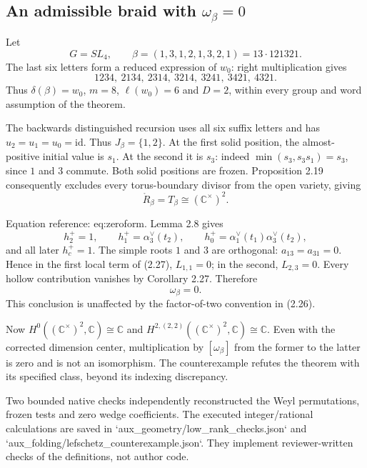 \documentclass[10pt]{article}
\begin{document}
\subsection*{An admissible braid with \(\omega_\beta=0\)}
Let \[G=SL_4,\qquad
 \beta=(1,3,1,2,1,3,2,1)=13\cdot121321 .\] The last six letters form a reduced expression of \(w_0\): right multiplication gives \[1234,\ 2134,\ 2314,\ 3214,\ 3241,\ 3421,\ 4321 .\] Thus \(\delta(\beta)=w_0\), \(m=8\), \(\ell(w_0)=6\) and \(D=2\), within every group and word assumption of the theorem.\par
The backwards distinguished recursion uses all six suffix letters and has \(u_2=u_1=u_0=\mathrm{id}\). Thus \(J_\beta=\{1,2\}\). At the first solid position, the almost-positive initial value is \(s_1\). At the second it is \(s_3\): indeed \(\min(s_3,s_3s_1)=s_3\), since \(1\) and \(3\) commute. Both solid positions are frozen. Proposition 2.19 consequently excludes every torus-boundary divisor from the open variety, giving \[\mathring R_\beta=T_\beta\cong(\mathbb C^\times)^2 .\]\par
Equation reference: eq:zeroform. Lemma 2.8 gives \[h_2^+=1,\qquad
 h_1^+=\alpha_3^\vee(t_2),\qquad
 h_0^+=\alpha_1^\vee(t_1)\alpha_3^\vee(t_2),\] and all later \(h_c^+=1\). The simple roots \(1\) and \(3\) are orthogonal: \(a_{13}=a_{31}=0\). Hence in the first local term of (2.27), \(L_{1,1}=0\); in the second, \(L_{2,3}=0\). Every hollow contribution vanishes by Corollary 2.27. Therefore \[
 \omega_\beta=0 .\] This conclusion is unaffected by the factor-of-two convention in (2.26).\par
Now \(H^0((\mathbb C^\times)^2,\mathbb C)\cong\mathbb C\) and \(H^{2,(2,2)}((\mathbb C^\times)^2,\mathbb C)\cong\mathbb C\). Even with the corrected dimension center, multiplication by \([\omega_\beta]\) from the former to the latter is zero and is not an isomorphism. The counterexample refutes the theorem with its specified class, beyond its indexing discrepancy.\par
Two bounded native checks independently reconstructed the Weyl permutations, frozen tests and zero wedge coefficients. The executed integer/rational calculations are saved in `aux\_geometry/low\_rank\_checks.json` and `aux\_folding/lefschetz\_counterexample.json`. They implement reviewer-written checks of the definitions, not author code.\par
\end{document}

